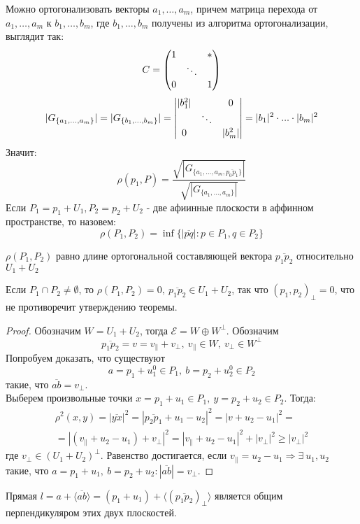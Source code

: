 Можно ортогонализовать векторы $a_1,\dots,a_m$, причем матрица перехода от $a_1,\dots,a_m$ к $b_1,\dots,b_m$, где $b_1,\dots,b_m$ получены из алгоритма ортогонализации, выглядит так:
\[C=\begin{pmatrix}
    1 & \null & *\\
    \null & \ddots & \null\\
    0 & \null & 1
\end{pmatrix}\]
\[|G_{\{a_1,\dots,a_m\}}| = |G_{\{b_1,\dots,b_m\}}| = \begin{vmatrix}
    |b_1^2| & \null & 0\\
    \null & \ddots & \null\\
    0 & \null & |b^2_m|
\end{vmatrix} = |b_1|^2 \cdot ... \cdot |b_m|^2\]
Значит:
\[\rho(p_1,P)=\frac{\sqrt{|G_{\{a_1,\dots,a_m,\overline{p_0p_1}\}}|}}{\sqrt{|G_{\{a_1,\dots,a_m\}}|}}\]
Если $P_1=p_1+U_1, P_2=p_2+U_2$ - две афиинные плоскости в аффинном пространстве, то назовем:
\[\rho(P_1,P_2)=\inf\{|\overline{pq}|: p\in P_1, q\in P_2\}\]
\begin{theorem}
    $\rho(P_1,P_2)$ равно длине ортогональной составляющей вектора $\overline{p_1p_2}$ относительно $U_1+U_2$
\end{theorem} 
\begin{remark}
    Если $P_1\cap P_2\ne \emptyset$, то $\rho(P_1,P_2)=0,\ \overline{p_1p_2} \in U_1+U_2$, так что $(p_1,p_2)_{\perp}=0$, что не противоречит утверждению теоремы.
\end{remark} 
\begin{proof}
    Обозначим $W=U_1+U_2$, тогда $\mathcal{E}=W\oplus W^{\perp}$. Обозначим 
    \[\overline{p_1p_2}=v=v_{\parallel}+v_{\perp},\ v_{\parallel}\in W,\ v_{\perp}\in W^{\perp}\] 
    Попробуем доказать, что существуют 
    \[a=p_1+u^0_1\in P_1,\ b=p_2+u^0_2\in P_2\] 
    такие, что $\overline{ab}=v_{\perp}$. \\
    Выберем произвольные точки $x=p_1+u_1\in P_1,\ y=p_2+u_2\in P_2$. Тогда:
    \begin{multline*}
        \rho^2(x,y)=|\overline{yx}|^2=|\overline{p_2p_1}+u_1-u_2|^2=|v+u_2-u_1|^2=\\
        =|(v_{\parallel}+u_2-u_1)+v_{\perp}|^2=|v_{\parallel}+u_2-u_1|^2+|v_{\perp}|^2\geq |v_{\perp}|^2
    \end{multline*}
    где $v_{\perp}\in (U_1+U_2)^{\perp}$. Равенство достигается, если $v_{\parallel}=u_2-u_1 \Rightarrow \exists\ u_1, u_2$ такие, что $a=p_1+u_1,\ b=p_2+u_2: |\overline{ab}|=v_{\perp}$.
\end{proof} 
\begin{consequense}
    Прямая $l=a+\langle \overline{ab} \rangle=(p_1+u_1)+\langle (\overline{p_1p_2})_{\perp} \rangle$ является общим перпендикуляром этих двух плоскостей.
\end{consequense} 
